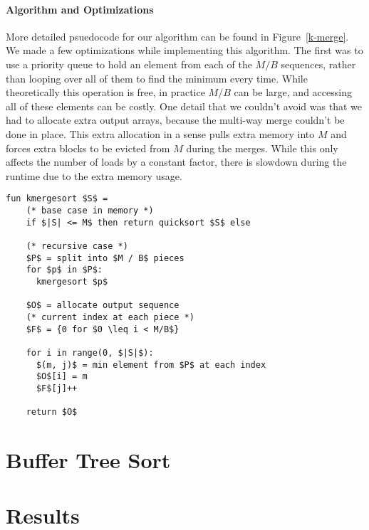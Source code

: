 \documentclass{article}
\begin{document}
\paragraph{Algorithm and Optimizations}
More detailed psuedocode for our algorithm can be found in Figure~\ref{k-merge}.
%
We made a few optimizations while implementing this algorithm.
%
The first was to use a priority queue to hold an element from
each of the $M/B$ sequences, rather than looping over
all of them to find the minimum every time.
%
While theoretically this operation is free, in practice $M/B$ can be large,
and accessing all of these elements can be costly.
%
One detail that we couldn't avoid was that we had to allocate extra output
arrays, because the multi-way merge couldn't be done in place.
%
This extra allocation in a sense pulls extra memory into $M$ and forces extra
blocks to be evicted from $M$ during the merges.
%
While this only affects the number of loads by a constant factor,
there is slowdown during the runtime due to the extra memory usage.

\begin{figure*}
\begin{lstlisting}[mathescape=true]
  fun kmergesort $S$ =
    (* base case in memory *)
    if $|S| <= M$ then return quicksort $S$ else

    (* recursive case *)
    $P$ = split into $M / B$ pieces
    for $p$ in $P$:
      kmergesort $p$

    $O$ = allocate output sequence
    (* current index at each piece *)
    $F$ = {0 for $0 \leq i < M/B$}

    for i in range(0, $|S|$):
      $(m, j)$ = min element from $P$ at each index
      $O$[i] = m
      $F$[j]++

    return $O$
\end{lstlisting}
\caption{K-way Mergesort Psuedocode}
\label{k-merge}
\end{figure*}


\section{Buffer Tree Sort}

\section{Results}
\end{document}

